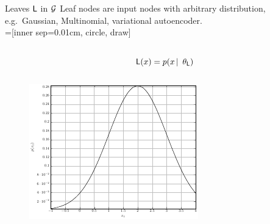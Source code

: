\begin{frame}{Leaves $\mathsf{L}$ in $\mathcal{G}$}
 Leaf nodes are input nodes with arbitrary distribution, e.g.~Gaussian, Multinomial, variational autoencoder.\\[1em]

=[inner sep=0.01cm, circle, draw]
\begin{columns}
\begin{column}{.2\linewidth}
\end{column}
\begin{column}{.2\linewidth}
\end{column}
\begin{column}{.4\linewidth}
$\Leaf(x) = p(x \cbar \tp_\Leaf)$
\end{column}
\begin{column}{.2\linewidth}
\end{column}
\end{columns}

\centering
\begin{figure}
\includegraphics{leaf_distribution}
\end{figure}
\end{frame}

